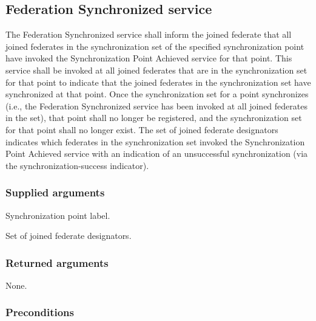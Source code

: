 \clearpage


\subsection{Federation Synchronized \rtiinitiated{} service}

The Federation Synchronized \rtiinitiated{} service shall inform the joined federate that all joined federates in the synchronization set of the specified synchronization point have invoked the Synchronization Point Achieved service for that point. This service shall be invoked at all joined federates that are in the synchronization set for that point to indicate that the joined federates in the synchronization set have synchronized at that point. Once the synchronization set for a point synchronizes (i.e., the Federation Synchronized \rtiinitiated{} service has been invoked at all joined federates in the set), that point shall no longer be registered, and the synchronization set for that point shall no longer exist. The set of joined federate designators indicates which federates in the synchronization set invoked the Synchronization Point Achieved service with an indication of an unsuccessful synchronization (via the synchronization-success indicator).

\subsubsection{Supplied arguments}

\begin{stdalphalist}
    \item Synchronization point label.
    \item Set of joined federate designators.
\end{stdalphalist}

\subsubsection{Returned arguments}

\begin{stdalphalist}
    \item None.
\end{stdalphalist}

\subsubsection{Preconditions}

